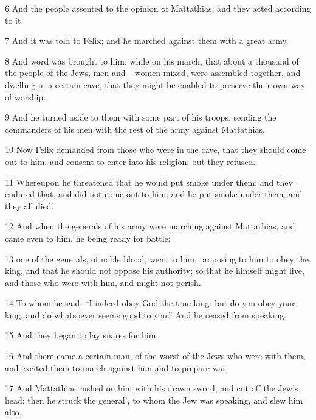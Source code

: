 \par 6 And the people assented to the opinion of Mattathias, and they acted according to it. 

\par 7 And it was told to Felix; and he marched against them with a great army. 

\par 8 And word was brought to him, while on his march, that about a thousand of the people of the Jews, men and _women mixed, were assembled together, and dwelling in a certain cave, that they might be enabled to preserve their own way of worship. 

\par 9 And he turned aside to them with some part of his troops, sending the commanders of his men with the rest of the army against Mattathias. 

\par 10 Now Felix demanded from those who were in the cave, that they should come out to him, and consent to enter into his religion; but they refused. 

\par 11 Whereupon he threatened that he would put smoke under them; and they endured that, and did not come out to him; and he put smoke under them, and they all died.

\par 12 And when the generals of his army were marching against Mattathias, and came even to him, he being ready for battle; 

\par 13 one of the generals, of noble blood, went to him, proposing to him to obey the king, and that he should not oppose his authority; so that he himself might live, and those who were with him, and might not perish. 

\par 14 To whom he said; “I indeed obey God the true king: but do you obey your king, and do whatsoever seems good to you.” And he ceased from speaking. 

\par 15 And they began to lay snares for him. 

\par 16 And there came a certain man, of the worst of the Jews who were with them, and excited them to march against him and to prepare war. 

\par 17 And Mattathias rushed on him with his drawn sword, and cut off the Jew’s head: then he struck the general’, to whom the Jew was speaking, and slew him also. 

